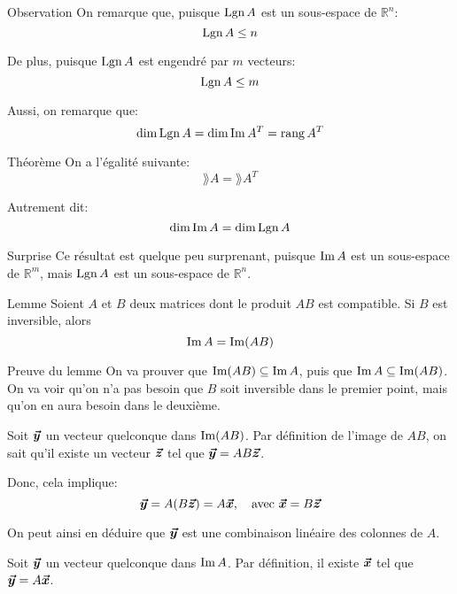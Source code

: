 \documentclass[a4paper]{article}
\begin{document}
\begin{parag}{Observation}
    On remarque que, puisque $\operatorname{Lgn} A$ est un sous-espace de $\mathbb{R}^{n}$:
    \[\operatorname{Lgn} A \leq n\]

    De plus, puisque $\operatorname{Lgn} A$ est engendré par $m$ vecteurs:
    \[\operatorname{Lgn} A \leq m\]

    Aussi, on remarque que:
    \[\dim\operatorname{Lgn} A = \dim\operatorname{Im} A^T = \operatorname{rang} A^T\]
\end{parag}

\begin{parag}{Théorème}
    On a l'égalité suivante:
    \[\rang A = \rang A^T\]

    Autrement dit:
    \[\dim\operatorname{Im} A = \dim\operatorname{Lgn} A\]

    \begin{subparag}{Surprise}
        Ce résultat est quelque peu surprenant, puisque $\operatorname{Im} A$ est un sous-espace de $\mathbb{R}^{m}$, mais $\operatorname{Lgn} A$ est un sous-espace de $\mathbb{R}^{n}$.
    \end{subparag}


    \begin{subparag}{Lemme}
        Soient $A$ et $B$ deux matrices dont le produit $AB$ est compatible. Si $B$ est inversible, alors
        \[\im A = \im\left(AB\right)\]
    \end{subparag}

    \begin{subparag}{Preuve du lemme}
        On va prouver que $\operatorname{Im}(AB) \subseteq \operatorname{Im} A$, puis que $\operatorname{Im} A \subseteq \operatorname{Im}(AB)$. On va voir qu'on n'a pas besoin que $B$ soit inversible dans le premier point, mais qu'on en aura besoin dans le deuxième.

        \vspace{1em}

         Soit $\bm{\protect\vec{y}}$ un vecteur quelconque dans $\operatorname{Im}(AB)$. Par définition de l'image de $AB$, on sait qu'il existe un vecteur $\bm{\protect\vec{z}}$ tel que $\bm{\protect\vec{y}} = AB \bm{\protect\vec{z}}$.

        Donc, cela implique:
        \[\bvec{y} = A\left(B \bvec{z}\right) = A \bvec{x}, \mathspace \text{avec } \bvec{x} = B \bvec{z}\]

        On peut ainsi en déduire que $\bm{\protect\vec{y}}$ est une combinaison linéaire des colonnes de $A$.

        \vspace{1em}

         Soit $\bm{\protect\vec{y}}$ un vecteur quelconque dans $\operatorname{Im} A$. Par définition, il existe $\bm{\protect\vec{x}}$ tel que $\bm{\protect\vec{y}} = A \bm{\protect\vec{x}}$.


\end{subparag}
\end{parag}
\end{document}
